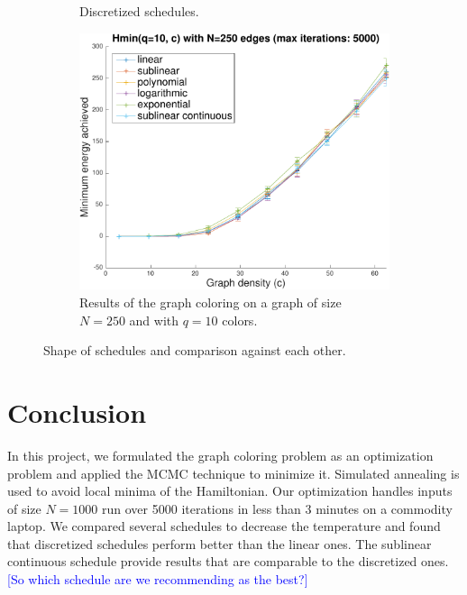 \documentclass{article}
\newcommand{\rbc}[1]{\textcolor{blue}{\small [#1]}} %
\begin{document}
\begin{figure}[h]
\begin{subfigure}[t]{.33\linewidth}
      \caption{Discretized schedules.}
      \label{fig:schedules_discretized_shape}
    \end{subfigure}%
    \begin{subfigure}[t]{.33\linewidth} %
      \centering
      \includegraphics[width=1\linewidth]{figures/schedules_evaluation.pdf}
      \caption{Results of the graph coloring on a graph of size $N=250$ and with $q=10$ colors.}
      \label{fig:schedules_evaluation}
    \end{subfigure}
    \caption{Shape of schedules and comparison against each other.}
    \label{fig:schedules}
  \end{figure}


  \section*{Conclusion}
  In this project, we formulated the graph coloring problem as an optimization problem and applied the MCMC technique to minimize it. Simulated annealing is used to avoid local minima of the Hamiltonian. Our optimization handles inputs of size $N=1000$ run over 5000 iterations in less than 3 minutes on a commodity laptop. We compared several schedules to decrease the temperature and found that discretized schedules perform better than the linear ones. The sublinear continuous schedule provide results that are comparable to the discretized ones.
\rbc{So which schedule are we recommending as the best?}
\end{document}
